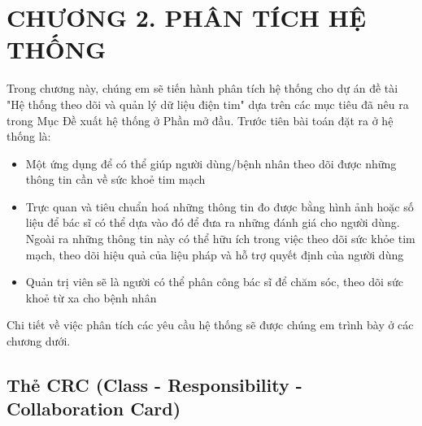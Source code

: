 
\section*{CHƯƠNG 2. PHÂN TÍCH HỆ THỐNG}
\setcounter{section}{2}
\setcounter{subsection}{0} %
\setcounter{table}{0} %
\setcounter{figure}{0} %
Trong chương này, chúng em sẽ tiến hành phân tích hệ thống cho dự án đề tài "Hệ thống theo dõi và quản lý dữ liệu điện tim" dựa trên các mục tiêu
đã nêu ra trong Mục Đề xuất hệ thống ở Phần mở đầu. Trước tiên bài toán đặt ra ở hệ thống là:
\begin{adjustwidth}{1.5em}{}
\begin{itemize}
  \item Một ứng dụng để có thể giúp người dùng/bệnh nhân theo dõi được những thông tin cần về sức khoẻ tim mạch
  \item Trực quan và tiêu chuẩn hoá những thông tin đo được
    bằng hình ảnh hoặc số liệu để bác sĩ có thể dựa vào đó để đưa ra những đánh giá cho người dùng. Ngoài ra những thông tin này
    có thể hữu ích trong việc theo dõi sức khỏe tim mạch, theo dõi hiệu quả của liệu pháp 
    và hỗ trợ quyết định của người dùng
  \item Quản trị viên sẽ là người có thể phân công bác sĩ để chăm sóc, theo dõi sức khoẻ từ
  xa cho bệnh nhân
\end{itemize}
\end{adjustwidth}
Chi tiết về việc phân tích các yêu cầu hệ thống sẽ được chúng em trình bày ở các chương dưới.
\subsection{Thẻ CRC (Class - Responsibility - Collaboration Card)}

